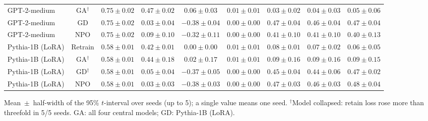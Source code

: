 \begin{table}[t]
\begin{tabular*}{\textwidth}{@{\extracolsep{\fill}}lcccccccc@{}}
GPT-2-medium & GA$^{\dagger}$ & $0.75 \pm 0.02$ & $0.47 \pm 0.02$ & $0.06 \pm 0.03$ & $0.01 \pm 0.01$ & $0.03 \pm 0.02$ & $0.04 \pm 0.03$ & $0.05 \pm 0.06$ \\
GPT-2-medium & GD & $0.75 \pm 0.02$ & $0.03 \pm 0.04$ & $-0.38 \pm 0.04$ & $0.00 \pm 0.00$ & $0.47 \pm 0.04$ & $0.46 \pm 0.04$ & $0.47 \pm 0.04$ \\
GPT-2-medium & NPO & $0.75 \pm 0.02$ & $0.09 \pm 0.10$ & $-0.32 \pm 0.11$ & $0.00 \pm 0.00$ & $0.41 \pm 0.10$ & $0.41 \pm 0.10$ & $0.40 \pm 0.13$ \\
Pythia-1B (LoRA) & Retrain & $0.58 \pm 0.01$ & $0.42 \pm 0.01$ & $0.00 \pm 0.00$ & $0.01 \pm 0.01$ & $0.08 \pm 0.01$ & $0.07 \pm 0.02$ & $0.06 \pm 0.05$ \\
Pythia-1B (LoRA) & GA$^{\dagger}$ & $0.58 \pm 0.01$ & $0.44 \pm 0.18$ & $0.02 \pm 0.17$ & $0.01 \pm 0.01$ & $0.09 \pm 0.16$ & $0.09 \pm 0.16$ & $0.09 \pm 0.15$ \\
Pythia-1B (LoRA) & GD$^{\dagger}$ & $0.58 \pm 0.01$ & $0.05 \pm 0.04$ & $-0.37 \pm 0.05$ & $0.00 \pm 0.00$ & $0.45 \pm 0.04$ & $0.44 \pm 0.06$ & $0.47 \pm 0.02$ \\
Pythia-1B (LoRA) & NPO & $0.58 \pm 0.01$ & $0.03 \pm 0.03$ & $-0.38 \pm 0.03$ & $0.00 \pm 0.00$ & $0.47 \pm 0.03$ & $0.46 \pm 0.03$ & $0.48 \pm 0.04$ \\
\bottomrule
\end{tabular*}

\smallskip
{\footnotesize Mean~$\pm$~half-width of the 95\% $t$-interval over seeds (up to 5); a single value means one seed. $^{\dagger}$Model collapsed: retain loss rose more than threefold in 5/5 seeds. GA: all four central models; GD: Pythia-1B (LoRA).\par}
\end{table}
